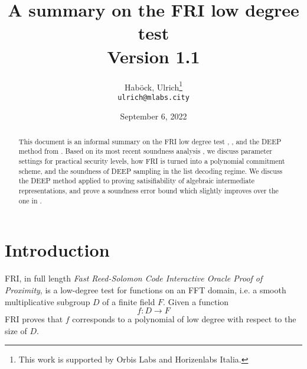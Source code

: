 \documentclass[11pt,article,oneside]{memoir}
\author{
    Hab{\"o}ck, Ulrich\thanks{This work is supported by Orbis Labs and Horizenlabs Italia.}
\\
    \texttt{ulrich@mlabs.city}
}
\theoremstyle{definition}
\theoremstyle{remark}
\begin{document}
\title{%
A summary on the FRI low degree test
\\
{\small Version 1.1}
}
\date{%
September 6, 2022
}
\maketitle

\setlength{\parskip}{5mm}


\begin{abstract}
This document is an informal summary on the FRI low degree test \cite{FRI}, \cite{ProximityGaps}, and the DEEP method  from \cite{DEEPFRI}. 
Based on its most recent soundness analysis \cite{ProximityGaps}, we discuss parameter settings for practical security levels, how FRI is turned into a polynomial commitment scheme, and the soundness of DEEP sampling in the list decoding regime.
We discuss the DEEP method applied to proving satisifiability of algebraic intermediate representations, and prove a soundness error bound  which slightly improves over the one in \cite{ethSTARK}.
\end{abstract}


\begin{KeepFromToc}
  \tableofcontents
\end{KeepFromToc}

\chapter{Introduction}
FRI, in full length \textit{Fast Reed-Solomon Code Interactive Oracle Proof of Proximity}, is a low-degree test for functions on an FFT domain, i.e. a smooth multiplicative subgroup $D$ of a finite field $F$.  
Given a function 
\[
f: D\longrightarrow F
\]
FRI proves that $f$ corresponds to a polynomial of low degree with respect to the size of $D$. 
\end{document}
